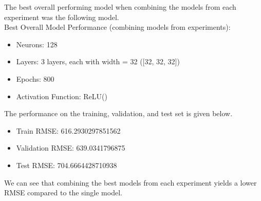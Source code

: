 \documentclass[12pt]{article}
\begin{document}
\begin{enumerate}[(a)]
  The best overall performing model when combining the models from each experiment was the following model. \\
  Best Overall Model Performance (combining models from experiments):
  \begin{itemize}
    \item Neurons: 128
    \item Layers: 3 layers, each with width = 32 ([32, 32, 32])
    \item Epochs: 800
    \item Activation Function: ReLU()
  \end{itemize}
  The performance on the training, validation, and test set is given below.
  \begin{itemize}
    \item Train RMSE: 616.2930297851562
    \item Validation RMSE: 639.0341796875
    \item Test RMSE: 704.6664428710938
  \end{itemize}
  We can see that combining the best models from each experiment yields a lower RMSE compared to the single model.

\end{enumerate}
\end{document}
